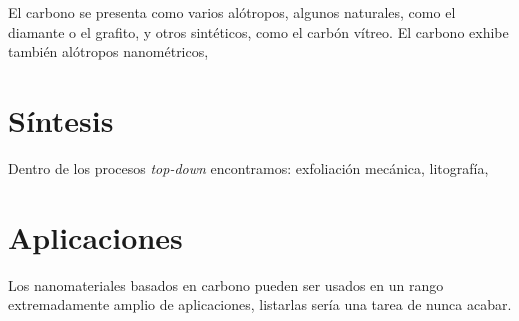 
El carbono se presenta como varios alótropos, algunos naturales, como el diamante o el grafito, y otros sintéticos, como el carbón vítreo. El carbono exhibe también alótropos nanométricos,

\section{Síntesis}


Dentro de los procesos \emph{top-down} encontramos: exfoliación mecánica, litografía, 

\section{Aplicaciones}
Los nanomateriales basados en carbono pueden ser usados en un rango extremadamente amplio de aplicaciones, listarlas sería una tarea de nunca acabar. 

